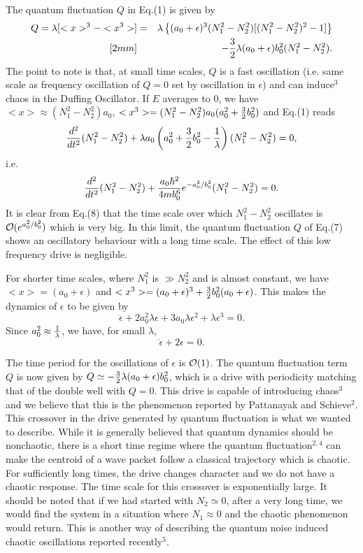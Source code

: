 The quantum fluctuation $Q$ in Eq.(1) is given by 
\begin{eqnarray}
Q = \lambda [ <x>^3 - <x^3> ] &=& \lambda \left\{ (a_0 + \epsilon)^3
(N_1^2 - N_2^2) [(N_1^2 - N^2_2)^2 - 1]\right\} \nonumber \\ [2mm]
&& - {3\over 2} \lambda (a_0 + \epsilon) b^2_0 (N^2_1 - N_2^2) .
\end{eqnarray}
The point to note is that, at small time scales, $Q$ is a fast
oscillation (i.e. same scale as frequency oscillation of $Q=0$ set by
oscillation in $\epsilon$) and can induce$^3$ chaos in the Duffing 
Oscillator. If $E$ averages to $0$, we have $<x> \approx (N^2_1 -
N_2^2) a_0$, $<x^3> = (N^2_1 - N_2^2) a_0 (a^2_0 + {3\over 2}
b^2_0)$ and Eq.(1) reads
$$
{d^2\over dt^2} (N^2_1 - N^2_2) + \lambda a_0 \left(a^2_0 + {3\over 2}
b^2_0 - {1\over \lambda}\right) (N^2_1 - N^2_2) = 0 ,
$$
i.e.
\begin{equation}
{d^2\over dt^2} (N^2_1 - N^2_2) + {a_0 \hbar^2 \over 4m b^6_0} 
e^{- a^2_0/b^2_0} (N^2_1 - N^2_2) = 0 .
\end{equation}
It is clear from Eq.(8) that the time scale over which $N^2_1 - N^2_2$
oscillates is ${\cal O} (e^{a^2_0/b^2_0})$ which is very big. In this limit,
the quantum fluctuation $Q$ of Eq.(7) shows an oscillatory behaviour
with a long time scale. The effect of this low frequency drive is
negligible.

For shorter time scales, where $N_1^2$ is $\gg N^2_2$ and is almost
constant, we have $<x> = (a_0 + \epsilon)$ and 
$<x^3> = (a_0 + \epsilon)^3 + {3\over 2} b^2_0 (a_0 + \epsilon)$. This 
makes the dynamics of $\epsilon$ to be given by
\begin{equation}
\ddot\epsilon + 2a^2_0 \lambda \epsilon + 3a_0 \lambda \epsilon^2 + \lambda
\epsilon^3 = 0 . 
\end{equation}
Since $a^2_0 \approx {1\over \lambda}$, we have, for small $\lambda$, 
\begin{equation}
\ddot\epsilon + 2 \epsilon = 0 .
\end{equation}

The time period for the oscillations of $\epsilon$ is ${\cal O} (1)$. The
quantum fluctuation term $Q$ is now given by $Q \simeq - {3\over 2}
\lambda (a_0 + \epsilon) b^2_0$, which is a drive with periodicity
matching that of the double well with $Q=0$. This drive is capable of 
introducing chaos$^3$ and we believe that this is the phenomenon
reported by Pattanayak and Schieve$^2$. This crossover in the drive
generated by quantum fluctuation is what we wanted to describe. While
it is generally believed that quantum dynamics should be nonchaotic,
there is a short time regime where the quantum fluctuation$^{2,4}$ can 
make the centroid of a wave packet follow a classical trajectory which 
is chaotic. For sufficiently long times, the drive changes character
and we do not have a chaotic response. The time scale for this
crossover is exponentially large. It should be noted that if we had
started with $N_2 \simeq 0$, after a very long time, we would find the
system in a situation where $N_1 \approx 0$ and the chaotic phenomenon 
would return. This is another way of describing the quantum noise
induced chaotic oscillations reported recently$^5$. 


